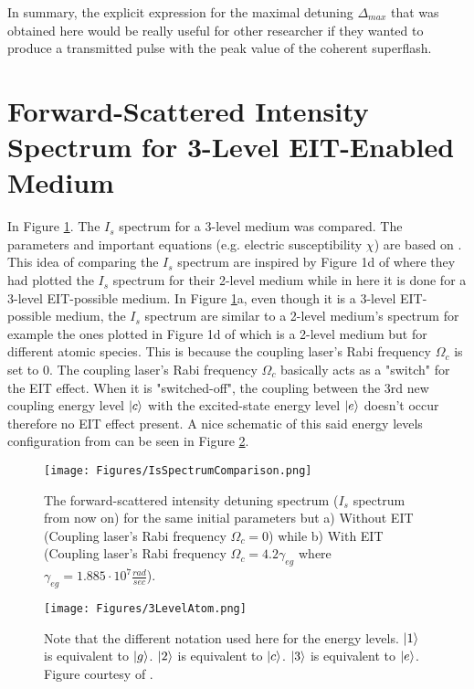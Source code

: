 In summary, the explicit expression for the maximal detuning $\Delta_{max}$ that was obtained here would be really useful for other researcher if they wanted to produce a transmitted pulse with the peak value of the coherent superflash.


\section{Forward-Scattered Intensity Spectrum for 3-Level EIT-Enabled Medium}
In Figure \ref{fig: comparing Is spectrum}. The $I_{s}$ spectrum for a 3-level medium was compared. The parameters and important equations (e.g. electric susceptibility $\chi$) are based on \cite{jeong2010slow}. This idea of comparing the $I_{s}$ spectrum are inspired by Figure 1d of \cite{Kwong2014} where they had plotted the $I_{s}$ spectrum for their 2-level medium while in here it is done for a 3-level EIT-possible medium. In Figure \ref{fig: comparing Is spectrum}a, even though it is a 3-level EIT-possible medium, the $I_{s}$ spectrum are similar to a 2-level medium's spectrum for example the ones plotted in Figure 1d of \cite{Kwong2014} which is a 2-level medium but for different atomic species. This is because the coupling laser's Rabi frequency $\Omega_{c}$ is set to $0$. The coupling laser's Rabi frequency $\Omega_{c}$ basically acts as a "switch" for the EIT effect. When it is "switched-off", the coupling between the 3rd new coupling energy level $\ket{c}$ with the excited-state energy level $\ket{e}$ doesn't occur therefore no EIT effect present. A nice schematic of this said energy levels configuration from \cite{Jeong2009} can be seen in Figure \ref{fig: 3LevelAtom}.

\begin{figure}[h!]
    \centering
    \texttt{[image: Figures/IsSpectrumComparison.png]}
    \caption{The forward-scattered intensity detuning spectrum ($I_{s}$ spectrum from now on) for the same initial parameters but a) Without EIT (Coupling laser's Rabi frequency $\Omega_{c} = 0$) while b) With EIT (Coupling laser's Rabi frequency $\Omega_{c} = 4.2\gamma_{eg}$ where $\gamma_{eg} = 1.885 \cdot 10^{7} \frac{rad}{sec}$).}
    \label{fig: comparing Is spectrum}
\end{figure}

\begin{figure}[h!]
    \centering
    \texttt{[image: Figures/3LevelAtom.png]}
    \caption{Note that the different notation used here for the energy levels. $\ket{1}$ is equivalent to $\ket{g}$. $\ket{2}$ is equivalent to $\ket{c}$. $\ket{3}$ is equivalent to $\ket{e}$. Figure courtesy of \cite{Jeong2009}.}
    \label{fig: 3LevelAtom}
\end{figure}

